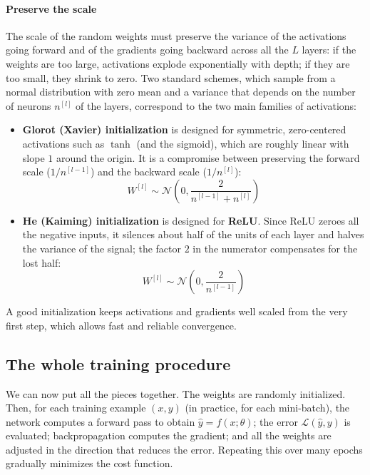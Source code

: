 \paragraph{Preserve the scale} The scale of the random weights must preserve the
variance of the activations going forward and of the gradients going backward across
all the $L$ layers: if the weights are too large, activations explode exponentially
with depth; if they are too small, they shrink to zero. Two standard schemes, which
sample from a normal distribution with zero mean and a variance that depends on the
number of neurons $n^{[l]}$ of the layers, correspond to the two main families of
activations:
\begin{itemize}
    \item \textbf{Glorot (Xavier) initialization} is designed for symmetric,
          zero-centered activations such as $\tanh$ (and the sigmoid), which are
          roughly linear with slope $1$ around the origin. It is a compromise
          between preserving the forward scale ($1/n^{[l-1]}$) and the backward
          scale ($1/n^{[l]}$):
          \begin{equation*}
              W^{[l]} \sim \mathcal{N}\left(0, \frac{2}{n^{[l-1]} + n^{[l]}}\right)
          \end{equation*}
    \item \textbf{He (Kaiming) initialization} is designed for \textbf{ReLU}.
          Since ReLU zeroes all the negative inputs, it silences about half of the
          units of each layer and halves the variance of the signal; the factor $2$
          in the numerator compensates for the lost half:
          \begin{equation*}
              W^{[l]} \sim \mathcal{N}\left(0, \frac{2}{n^{[l-1]}}\right)
          \end{equation*}
\end{itemize}
A good initialization keeps activations and gradients well scaled from the very
first step, which allows fast and reliable convergence.

\subsection{The whole training procedure}
We can now put all the pieces together. The weights are randomly initialized. Then,
for each training example $(x, y)$ (in practice, for each mini-batch), the network
computes a forward pass to obtain $\hat{y} = f(x; \theta)$; the error
$\mathcal{L}(\hat{y}, y)$ is evaluated; backpropagation computes the gradient; and
all the weights are adjusted in the direction that reduces the error. Repeating this
over many epochs gradually minimizes the cost function.

